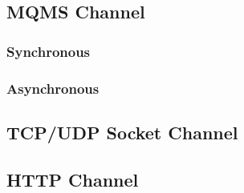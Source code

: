 \subsection{MQMS Channel}
\subsubsection{Synchronous}
\subsubsection{Asynchronous}

\subsection{TCP/UDP Socket Channel}
\subsection{HTTP Channel}


